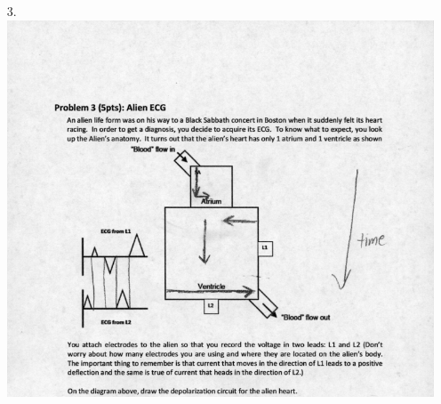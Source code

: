 \documentclass{article}
\begin{document}
\begin{enumerate}
\item[3.] $\:$ \\
	\includegraphics[scale=0.75]{../images/P3_AlienHeart} \\

\end{enumerate}
\end{document}
